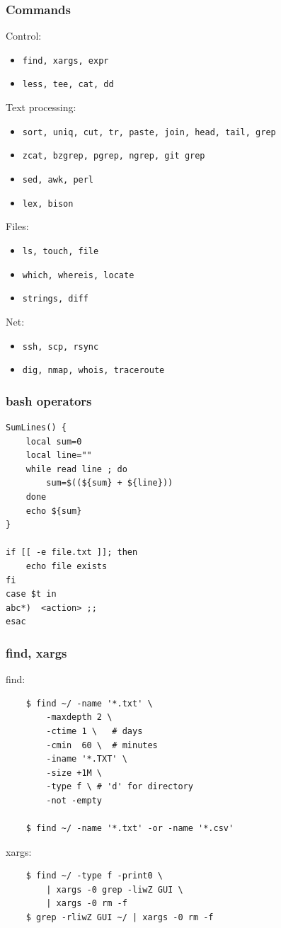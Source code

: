 \documentclass[hyperref={unicode=true}]{beamer}
\begin{document}
\begin{frame}
	\frametitle{Commands}
	Control:
	\begin{itemize}
		\item \texttt{find, xargs, expr}
		\item \texttt{less, tee, cat, dd}
	\end{itemize}
	Text processing:
	\begin{itemize}
		\item \texttt{sort, uniq, cut, tr, paste, join, head, tail, grep}
		\item \texttt{zcat, bzgrep, pgrep, ngrep, git grep}
		\item \texttt{sed, awk, perl}
		\item \texttt{lex, bison}
	\end{itemize}
	Files:
	\begin{itemize}
		\item \texttt{ls, touch, file}
		\item \texttt{which, whereis, locate}
		\item \texttt{strings, diff}
	\end{itemize}
	Net:
	\begin{itemize}
		\item \texttt{ssh, scp, rsync}
		\item \texttt{dig, nmap, whois, traceroute}
	\end{itemize}
\end{frame}

\begin{frame}[fragile]
	\frametitle{bash operators}
	\begin{verbatim}
SumLines() {
    local sum=0
    local line=""
    while read line ; do
        sum=$((${sum} + ${line}))
    done
    echo ${sum}
}

if [[ -e file.txt ]]; then
    echo file exists
fi
case $t in
abc*)  <action> ;;
esac
	\end{verbatim}
\end{frame}

\begin{frame}[fragile]
	\frametitle{find, xargs}
    find:
	\begin{addmargin}[1em]{0em}
	\begin{verbatim}
    $ find ~/ -name '*.txt' \
        -maxdepth 2 \
        -ctime 1 \   # days
        -cmin  60 \  # minutes
        -iname '*.TXT' \
        -size +1M \
        -type f \ # 'd' for directory
        -not -empty

    $ find ~/ -name '*.txt' -or -name '*.csv'
	\end{verbatim}
	\end{addmargin}

    xargs:
	\begin{addmargin}[1em]{0em}
	\begin{verbatim}
    $ find ~/ -type f -print0 \
        | xargs -0 grep -liwZ GUI \
        | xargs -0 rm -f
    $ grep -rliwZ GUI ~/ | xargs -0 rm -f
	\end{verbatim}
	\end{addmargin}

\end{frame}
\end{document}
